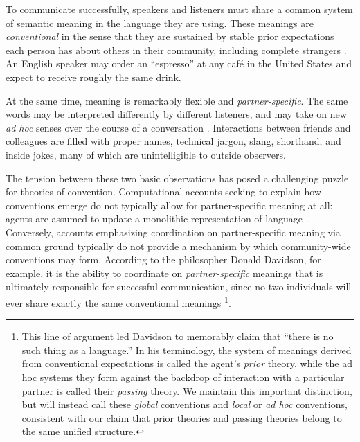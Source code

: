 

To communicate successfully, speakers and listeners must share a common system of semantic meaning in the language they are using. 
These meanings are \emph{conventional} in the sense that they are sustained by stable prior expectations each person has about others in their community, including complete strangers \cite{lewis_convention:_1969, hawkins2019emergence}.
An English speaker may order an ``espresso'' at any café in the United States and expect to receive roughly the same drink.

At the same time, meaning is remarkably flexible and \emph{partner-specific}.
The same words may be interpreted differently by different listeners, and may take on new \emph{ad hoc} senses over the course of a conversation \cite{clark_using_1996}. 
Interactions between friends and colleagues are filled with proper names, technical jargon, slang, shorthand, and inside jokes, many of which are unintelligible to outside observers.

The tension between these two basic observations has posed a challenging puzzle for theories of convention.
Computational accounts seeking to explain how conventions emerge do not typically allow for partner-specific meaning at all: agents are assumed to update a monolithic representation of language \cite{steels_self-organizing_1995,barr_establishing_2004,young_evolution_2015}.
Conversely, accounts emphasizing coordination on partner-specific meaning via common ground typically do not provide a mechanism by which community-wide conventions may form.
According to the philosopher Donald Davidson, for example, it is the ability to coordinate on \emph{partner-specific} meanings that is ultimately responsible for successful communication, since no two individuals will ever share exactly the same conventional meanings \cite{davidson1984communication,davidson_nice_1986}\footnote{This line of argument led Davidson to memorably claim that ``there is no such thing as a language.'' In his terminology, the system of meanings derived from conventional expectations is called the agent's \emph{prior} theory, while the ad hoc systems they form against the backdrop of interaction with a particular partner is called their \emph{passing} theory. We maintain this important distinction, but will instead call these \emph{global} conventions and \emph{local} or \emph{ad hoc} conventions, consistent with our claim that prior theories and passing theories belong to the same unified structure.}.

